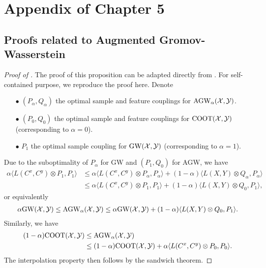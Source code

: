 \section{Appendix of Chapter 5}

\subsection{Proofs related to Augmented Gromov-Wasserstein} \label{appendix:agw}

\begin{proof}[Proof of ]
  The proof of this proposition can be adapted directly from \citep{Vayer19b}.
  For self-contained purpose, we reproduce the proof here. Denote
  \begin{itemize}
      \item[$\bullet$] $(P_{\alpha}, Q_{\alpha})$ the optimal sample and feature couplings for
      $\text{AGW}_{\alpha}(\mathcal X, \mathcal Y)$.

      \item[$\bullet$] $(P_0, Q_0)$ the optimal sample and feature couplings for
      $\text{COOT}(\mathcal X, \mathcal Y)$ (corresponding to $\alpha = 0$).

      \item[$\bullet$] $P_1$ the optimal sample coupling for $\text{GW}(\mathcal X, \mathcal Y)$
      (corresponding to $\alpha = 1$).
  \end{itemize}
  Due to the suboptimality of $P_{\alpha}$ for GW and $(P_1, Q_0)$ for AGW, we have
  \begin{align}
      \alpha \langle L(C^x, C^y) \otimes P_1, P_1 \rangle
      &\leq \alpha \langle L(C^x, C^y) \otimes P_{\alpha}, P_{\alpha} \rangle
      + (1 - \alpha) \langle L(X, Y) \otimes Q_{\alpha}, P_{\alpha} \rangle \\
      &\leq \alpha \langle L(C^x, C^y) \otimes P_1, P_1 \rangle
      + (1 - \alpha) \langle L(X, Y) \otimes Q_0, P_1 \rangle,
  \end{align}
  or equivalently
  \begin{align}
      \alpha \text{GW}(\mathcal X, \mathcal Y) \leq \text{AGW}_{\alpha}(\mathcal X, \mathcal Y) \leq \alpha \text{GW}(\mathcal X, \mathcal Y)
      + (1 - \alpha) \langle L(X, Y) \otimes Q_0, P_1 \rangle.
  \end{align}
  Similarly, we have
  \begin{align}
      (1 - \alpha) \text{COOT}(\mathcal X, \mathcal Y) &\leq \text{AGW}_{\alpha}(\mathcal X, \mathcal Y) \\
      &\leq (1 - \alpha) \text{COOT}(\mathcal X, \mathcal Y) + \alpha \langle L(C^x, C^y) \otimes P_0, P_0 \rangle.
  \end{align}
  The interpolation property then follows by the sandwich theorem.


\end{proof}
